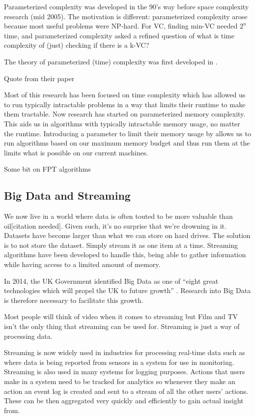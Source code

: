 Parameterized complexity was developed in the 90's way before space complexity
research (mid 2005). The motivation is different: parameterized complexity
arose because most useful problems were NP-hard. For VC, finding min-VC needed
$2^n$ time, and parameterized complexity asked a refined question of what is time
complexity of (just) checking if there is a k-VC?

The theory of parameterized (time) complexity was first developed in
\cite{downey1999parameterized}.

Quote from their paper

Most of this research has been focused on time complexity which has allowed us
to run typically intractable problems in a way that limits their runtime to
make them tractable. Now research has started on parameterized memory
complexity. This aids us in algorithms with typically intractable memory usage,
no matter the runtime. Introducing a parameter to limit their memory usage by
allows us to run algorithms based on our maximum memory budget and thus run
them at the limits what is possible on our current machines.

Some bit on FPT algorithms

\subsection{Big Data and Streaming}

We now live in a world where data is often touted to be more valuable than
oil[citation needed]. Given such, it's no surprise that we're drowning in it.
Datasets have become larger than what we can store on hard drives. The solution
is to not store the dataset. Simply stream it as one item at a time. Streaming
algorithms have been developed to handle this, being able to gather information
while having access to a limited amount of memory.

In 2014, the UK Government identified Big Data as one of ``eight great
technologies which will propel the UK to future growth''
\cite{intellectualpropertyoffice2014}. Research into Big Data is therefore
necessary to facilitate this growth.

Most people will think of video when it comes to streaming but Film and TV
isn't the only thing that streaming can be used for. Streaming is just a way of
processing data.

Streaming is now widely used in industries for processing real-time data such
as where data is being reported from sensors in a system for use in monitoring.
Streaming is also used in many systems for logging purposes. Actions that users
make in a system need to be tracked for analytics so whenever they make an
action an event log is created and sent to a stream of all the other users'
actions. These can be then aggregated very quickly and efficiently to gain
actual insight from.

